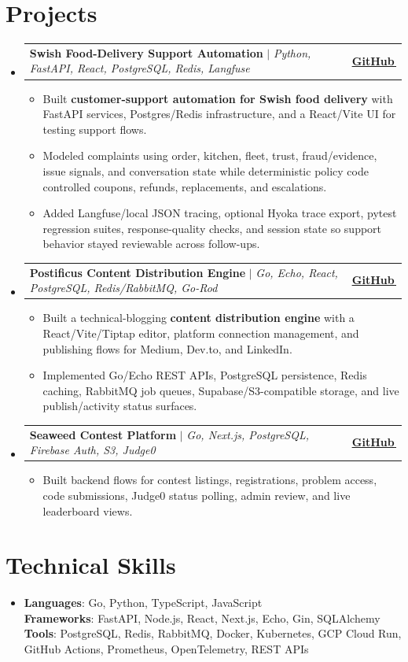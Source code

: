 \documentclass[letterpaper,11pt]{article}
\makeatletter
\newcommand{\bodyhref}[2]{\href{#1}{\underline{#2}\,\faExternalLink*}}
\newcommand{\resumeItem}[1]{\item{\fontsize{8.82pt}{9.28pt}\selectfont #1\vspace{-0.7pt}}}
\newcommand{\resumeProjectHeading}[2]{
    \item
    \begin{tabular*}{1.0\textwidth}{l@{\extracolsep{\fill}}r}
      \small#1 & \textbf{\small #2}\\
    \end{tabular*}\vspace{-4pt}
}
\newcommand{\resumeSubHeadingListStart}{\begin{itemize}[leftmargin=0.0in, label={}, itemsep=0.6pt, topsep=0pt, parsep=0pt, partopsep=0pt]}
\newcommand{\resumeSubHeadingListEnd}{\end{itemize}}
\newcommand{\resumeItemListStart}{\begin{itemize}[leftmargin=0.16in,itemsep=0.3pt,topsep=0.9pt,parsep=0pt,partopsep=0pt]}
\newcommand{\resumeItemListEnd}{\end{itemize}\vspace{-3pt}}
\makeatother
\begin{document}
\section{Projects}
\resumeSubHeadingListStart
\resumeProjectHeading
{\textbf{Swish Food-Delivery Support Automation} $|$ \emph{Python, FastAPI, React, PostgreSQL, Redis, Langfuse}}{\bodyhref{https://github.com/unichronic/swishagent}{GitHub}}
\resumeItemListStart
\resumeItem{Built \textbf{customer-support automation for Swish food delivery} with FastAPI services, Postgres/Redis infrastructure, and a React/Vite UI for testing support flows.}
\resumeItem{Modeled complaints using order, kitchen, fleet, trust, fraud/evidence, issue signals, and conversation state while deterministic policy code controlled coupons, refunds, replacements, and escalations.}
\resumeItem{Added Langfuse/local JSON tracing, optional Hyoka trace export, pytest regression suites, response-quality checks, and session state so support behavior stayed reviewable across follow-ups.}
\resumeItemListEnd
\resumeProjectHeading
{\textbf{Postificus Content Distribution Engine} $|$ \emph{Go, Echo, React, PostgreSQL, Redis/RabbitMQ, Go-Rod}}{\bodyhref{https://github.com/unichronic/postificus}{GitHub}}
\resumeItemListStart
\resumeItem{Built a technical-blogging \textbf{content distribution engine} with a React/Vite/Tiptap editor, platform connection management, and publishing flows for Medium, Dev.to, and LinkedIn.}
\resumeItem{Implemented Go/Echo REST APIs, PostgreSQL persistence, Redis caching, RabbitMQ job queues, Supabase/S3-compatible storage, and live publish/activity status surfaces.}
\resumeItemListEnd
\resumeProjectHeading
{\textbf{Seaweed Contest Platform} $|$ \emph{Go, Next.js, PostgreSQL, Firebase Auth, S3, Judge0}}{\bodyhref{https://github.com/unichronic/seaweed-fe}{GitHub}}
\resumeItemListStart
\resumeItem{Built backend flows for contest listings, registrations, problem access, code submissions, Judge0 status polling, admin review, and live leaderboard views.}
\resumeItemListEnd
\resumeSubHeadingListEnd

\section{Technical Skills}
\begin{itemize}[leftmargin=0.15in, label={}, topsep=0pt, itemsep=0pt, parsep=0pt, partopsep=0pt]
  \item{\fontsize{9.0pt}{9.25pt}\selectfont
   \textbf{Languages}{: Go, Python, TypeScript, JavaScript} \\
   \textbf{Frameworks}{: FastAPI, Node.js, React, Next.js, Echo, Gin, SQLAlchemy} \\
   \textbf{Tools}{: PostgreSQL, Redis, RabbitMQ, Docker, Kubernetes, GCP Cloud Run, GitHub Actions, Prometheus, OpenTelemetry, REST APIs} \\
  }
\end{itemize}
\end{document}
